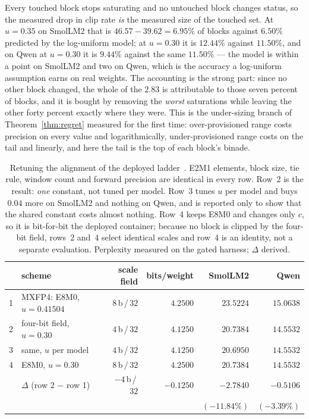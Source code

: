 \documentclass[11pt]{article}
\theoremstyle{definition}
\begin{document}
Every touched block stops saturating and no untouched block changes status, so
the measured drop in clip rate \emph{is} the measured size of the touched set.
At $u=0.35$ on SmolLM2 that is $46.57-39.62 = 6.95\%$ of blocks against
$6.50\%$ predicted by the log-uniform model; at $u=0.30$ it is $12.44\%$ against
$11.50\%$, and on Qwen at $u=0.30$ it is $9.44\%$ against the same $11.50\%$ ---
the model is within a point on SmolLM2 and two on Qwen, which is the accuracy a
log-uniform assumption earns on real weights.%
The accounting is the strong part: since no other block changed, the whole of
the $2.83$ is attributable to those seven percent of blocks, and it is bought by
removing the \emph{worst} saturations while leaving the other forty percent
exactly where they were. This is the under-sizing branch of
Theorem~\ref{thm:regret} measured for the first time: over-provisioned range
costs precision on every value and logarithmically, under-provisioned range
costs on the tail and linearly, and here the tail is the top of each block's
binade.

\begin{table}[t]\centering
\caption{Retuning the alignment of the deployed ladder~\cite{ocpmx}. E2M1
elements, block size, tie rule, window count and forward precision are identical
in every row.
Row~2 is the result: \emph{one} constant, not tuned per model. Row~3 tunes $u$
per model and buys $0.04$ more on SmolLM2 and nothing on Qwen, and is reported
only to show that the shared constant costs almost nothing. Row~4 keeps E8M0 and changes only $c$,
so it is bit-for-bit the deployed container; because no block is clipped by the
four-bit field, rows~2 and~4 select identical scales and row~4 is an identity,
not a separate evaluation. Perplexity measured on the gated harness; $\Delta$
derived.}
\label{tab:retune}
\begin{tabular}{llrrrr}
\toprule
 & scheme & scale field & bits/weight & SmolLM2 & Qwen \\
\midrule
1 & MXFP4: E8M0, $u=0.41504$ & $8$\,b\,/\,$32$ & $4.2500$ & $23.5224$ & $15.0638$ \\
2 & four-bit field, $u=0.30$ & $4$\,b\,/\,$32$ & $\mathbf{4.1250}$ & $\mathbf{20.7384}$ & $\mathbf{14.5532}$ \\
3 & \quad same, $u$ per model & $4$\,b\,/\,$32$ & $4.1250$ & $20.6950$ & $14.5532$ \\
4 & E8M0, $u=0.30$ & $8$\,b\,/\,$32$ & $4.2500$ & $20.7384$ & $14.5532$ \\
\midrule
  & $\Delta$ (row 2 $-$ row 1) & $-4$\,b\,/\,$32$ & $-0.1250$ & $-2.7840$ & $-0.5106$ \\
  &                            &                  &           & $(-11.84\%)$ & $(-3.39\%)$ \\
\bottomrule
\end{tabular}
\end{table}
\end{document}
